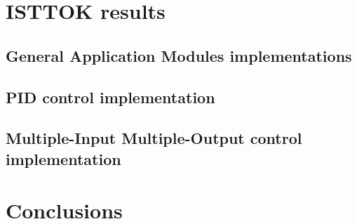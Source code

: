 \documentclass{article}
\begin{document}
\hfil
\section{ISTTOK  results }
\subsection{General Application Modules  implementations}
\subsection{PID control implementation}
\subsection{Multiple-Input Multiple-Output control implementation}
\hfil

\section{Conclusions}
\end{document}
